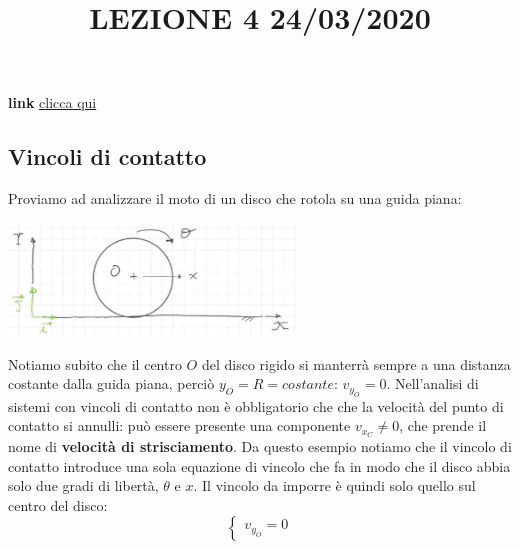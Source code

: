 \title{LEZIONE 4 24/03/2020}\newline
\textbf{link} \href{https://web.microsoftstream.com/video/ddba4e0e-486c-4e25-9074-9749fa6a08f5?list=user&userId=8750338c-1a15-456b-9dc7-11c7358842b4}{clicca qui}
\subsection{Vincoli di contatto}
Proviamo ad analizzare il moto di un disco che rotola su una guida piana:
\begin{center}
    \includegraphics[height=3cm]{../lezione4/img1.JPG}
\end{center}
Notiamo subito che il centro $O$ del disco rigido si manterrà sempre a una distanza costante dalla guida piana, perciò $y_O = R = costante$: $v_{y_O} = 0$.\newline
\newline
Nell'analisi di sistemi con vincoli di contatto non è obbligatorio che che la velocità del punto di contatto si annulli: può essere presente una componente $v_{x_C} \neq 0$, che prende il nome di \textbf{velocità di strisciamento}.\newline
\newline
Da questo esempio notiamo che il vincolo di contatto introduce una sola equazione di vincolo che fa in modo che il disco abbia solo due gradi di libertà, $\theta$ e $x$.\newline
\newline
Il vincolo da imporre è quindi solo quello sul centro del disco:
\[
    \begin{cases}
        v_{y_O} = 0
    \end{cases}
\]
